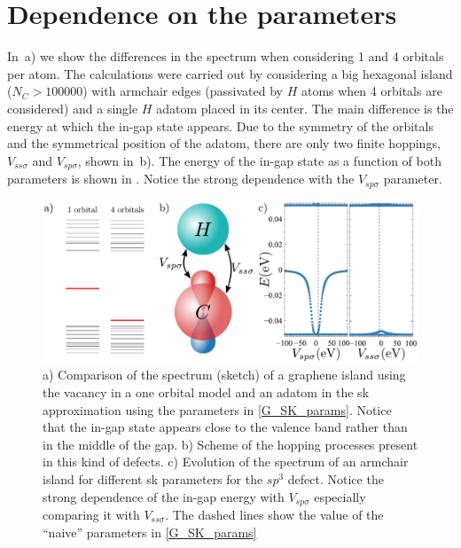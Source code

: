 \section{Dependence on the parameters}
In~a) we show the differences in the spectrum when considering 1 and 4 orbitals per atom. The calculations were carried out by considering a big hexagonal island ($N_C>100000$) with armchair edges (passivated by $H$ atoms when 4 orbitals are considered) and a single $H$ adatom placed in its center.
The main difference is the energy at which the in-gap state appears.
Due to the symmetry of the orbitals and the symmetrical position of the adatom, there are only two finite hoppings, $V_{ss\sigma}$ and $V_{sp\sigma}$, shown in~b).
The energy of the in-gap state as a function of both parameters is shown in . Notice the strong dependence with the $V_{sp\sigma}$ parameter.

\begin{figure}[h!]
  \centering
  \includegraphics{defects/fig/Vsss_Vsps.pdf}
  \vspace{-5pt}
  \caption{a) Comparison of the spectrum (sketch) of a graphene island using the vacancy in a one orbital model and an adatom in the \ac{sk} approximation using the parameters in \ref{G_SK_params}. Notice that the in-gap state appears close to the valence band rather than in the middle of the gap. b) Scheme of the hopping processes present in this kind of defects. c) Evolution of the spectrum of an armchair island for different \ac{sk} parameters for the $sp^3$ defect. Notice the strong dependence of the in-gap energy with $V_{sp\sigma}$ especially comparing it with $V_{ss\sigma}$. The dashed lines show the value of the ``naive'' parameters in \ref{G_SK_params}}
\label{ingap}
\end{figure}

